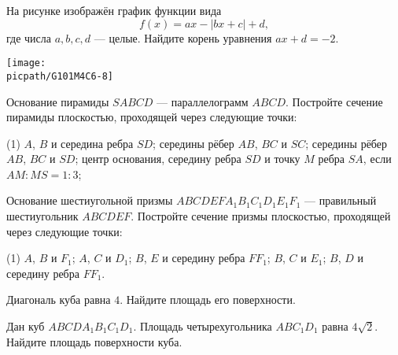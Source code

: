\begin{class}[number=3]
\begin{listofex}
		\item
		\begin{minipage}[t]{\bodywidth}
			На рисунке изображён график функции вида \[ f(x)=ax-|bx+c|+d, \] где числа \(a, b, c, d\) --- целые. Найдите корень уравнения \(ax+d=-2\).
		\end{minipage}
		\hspace{0.02\linewidth}
		\begin{minipage}[t]{\picwidth}
			\texttt{[image: \\picpath/G101M4C6-8]}
		\end{minipage}
	\end{listofex}
\end{class}

\begin{class}[number=4]
	\begin{listofex}
		\item Основание пирамиды \( SABCD \) --- параллелограмм \( ABCD \).
		Постройте сечение пирамиды плоскостью, проходящей через следующие
		точки:
		\begin{tasks}(1)
			\task \( A \), \( B \) и середина ребра \( SD \);
			\task середины рёбер \( AB \), \( BC \) и \( SC \);
			\task середины рёбер \( AB \), \( BC \) и \( SD \);
			\task центр основания, середину ребра \( SD \) и точку \( M \) ребра \( SA \),
			если \( AM : MS = 1 : 3 \);
		\end{tasks}
		\item Основание шестиугольной призмы \( ABCDEFA_1B_1C_1D_1E_1F_1 \) ---
		правильный шестиугольник \( ABCDEF \).
		Постройте сечение призмы плоскостью,
		проходящей через следующие точки:
		\begin{tasks}(1)
			\task \( A \), \( B \) и \( F_1 \);
			\task \( A \), \( C \) и \( D_1 \);
			\task \( B \), \( E \) и середину ребра \( FF_1 \);
			\task \( B \), \( C \) и \( E_1 \);
			\task \( B \), \( D \) и середину ребра \( FF_1 \).
		\end{tasks}
		\item Диагональ куба равна \( 4 \). Найдите площадь его поверхности.
		\item Дан куб \( ABCDA_1B_1C_1D_1 \). Площадь четырехугольника \( ABC_1D_1 \) равна \( 4\sqrt{2} \). Найдите площадь поверхности куба.
	\end{listofex}
\end{class}

